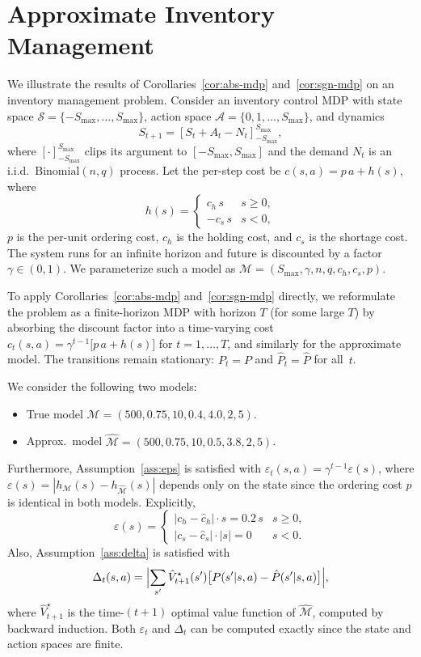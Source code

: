 \documentclass[10pt]{article}
\theoremstyle{definition}
\newcommand{\clipS}[1]{\left[#1\right]_{-S_{\max}}^{S_{\max}}}
\begin{document}
\section*{Approximate Inventory Management}

We illustrate the results of Corollaries~\ref{cor:abs-mdp}
and~\ref{cor:sgn-mdp} on an inventory management problem. Consider an
inventory control MDP with state space
$\mathcal{S} = \{-S_{\max}, \dots, S_{\max}\}$, action space
$\mathcal{A} = \{0, 1, \dots, S_{\max}\}$, and dynamics
\[
S_{t+1} = \clipS{S_t + A_t - N_t},
\]
where $[\cdot]_{-S_{\max}}^{S_{\max}}$ clips its argument to
$[-S_{\max}, S_{\max}]$ and the demand $N_t$ is an i.i.d.\
$\text{Binomial}(n, q)$ process. Let the per-step cost be
$c(s,a) = p\,a + h(s)$, where
\[
h(s) =
\begin{cases}
  c_h\, s & s \ge 0,\\
  -c_s\, s & s < 0,
\end{cases}
\]
$p$ is the per-unit ordering cost, $c_h$ is the holding cost, and $c_s$
is the shortage cost. The system runs for an infinite horizon and future
is discounted by a factor $\gamma \in (0,1)$. We parameterize such a
model as $\mathcal{M} = (S_{\max}, \gamma, n, q, c_h, c_s, p)$.

To apply Corollaries~\ref{cor:abs-mdp} and~\ref{cor:sgn-mdp} directly,
we reformulate the problem as a finite-horizon MDP with horizon $T$
(for some large $T$) by absorbing the discount factor into a
time-varying cost $c_t(s,a) = \gamma^{t-1}\bigl[p\,a + h(s)\bigr]$ for
$t = 1, \dots, T$, and similarly for the approximate model. The
transitions remain stationary: $P_t = P$ and $\hat P_t = \hat P$ for
all~$t$.

We consider the following two models:
\begin{itemize}
  \item True model \phantom{Approx.\ }$\mathcal{M} = (500, 0.75, 10, 0.4, 4.0, 2, 5)$.
  \item Approx.\ model $\hat{\mathcal{M}} = (500, 0.75, 10, 0.5, 3.8, 2, 5)$.
\end{itemize}
Furthermore, Assumption~\ref{ass:eps} is satisfied with
$\varepsilon_t(s,a) = \gamma^{t-1}\varepsilon(s)$, where
$\varepsilon(s) = |h_{\mathcal{M}}(s) - h_{\hat{\mathcal{M}}}(s)|$
depends only on the state since the ordering cost $p$ is identical in
both models. Explicitly,
\[
\varepsilon(s) =
\begin{cases}
  |c_h - \hat c_h| \cdot s = 0.2\,s & s \ge 0,\\
  |c_s - \hat c_s| \cdot |s| = 0 & s < 0.
\end{cases}
\]
Also, Assumption~\ref{ass:delta} is satisfied with
\[
\Delta_t(s,a) = \Bigl|\sum_{s'} \hat V^\star_{t+1}(s')
  \bigl[P(s'|s,a) - \hat P(s'|s,a)\bigr]\Bigr|,
\]
where $\hat V^\star_{t+1}$ is the time-$(t{+}1)$ optimal value function
of $\hat{\mathcal{M}}$, computed by backward induction. Both
$\varepsilon_t$ and $\Delta_t$ can be computed exactly since the state
and action spaces are finite.
\end{document}
